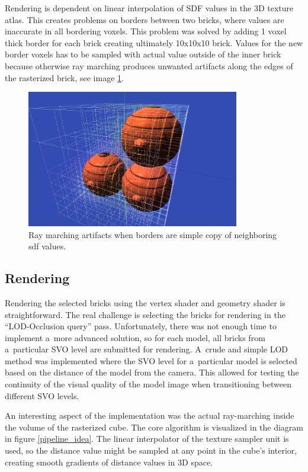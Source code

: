 \documentclass[11pt, a4paper]{article}
\renewcommand{\uv}[1]{``#1''}
\begin{document}
Rendering is dependent on linear interpolation of SDF values in the 3D texture atlas.
This creates problems on borders between two bricks, where values are inaccurate in all bordering voxels.
This problem was solved by adding 1 voxel thick border for each brick creating ultimately 10x10x10 brick.
Values for the new border voxels has to be sampled with actual value outside of the inner brick because otherwise ray marching produces unwanted artifacts along the edges of the rasterized brick, see image \ref{border_artifacts}.
\begin{figure}[ht]
    \centering
    \includegraphics[height=6cm]{marching_artifacts.png}
    \caption{Ray marching artifacts when borders are simple copy of neighboring sdf values.}
    \label{border_artifacts}
\end{figure}

\subsection{Rendering}
Rendering the selected bricks using the vertex shader and geometry shader is straightforward. The real challenge is selecting the bricks for rendering in the \uv{LOD-Occlusion query} pass.
Unfortunately, there was not enough time to implement a~more advanced solution, so for each model, all bricks from a~particular SVO level are submitted for rendering. A~crude and simple LOD method was implemented where the SVO level for a~particular model is selected based on the distance of the model from the camera. This allowed for testing the continuity of the visual quality of the model image when transitioning between different SVO levels.

An interesting aspect of the implementation was the actual ray-marching inside the volume of the rasterized cube. The core algorithm is visualized in the diagram in figure \ref{pipeline_idea}. The linear interpolator of the texture sampler unit is used, so the distance value might be sampled at any point in the cube's interior, creating smooth gradients of distance values in 3D space.
\end{document}
